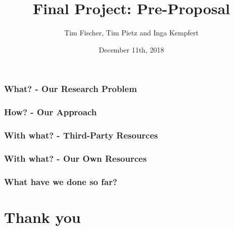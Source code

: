 \documentclass[unknownkeysallowed,aspectratio=169]{beamer}
\date{December 11th, 2018}
\title[Pre-Proposal]{Final Project: Pre-Proposal}
\subtitle[]{}
\author[T. Fischer, T. Pietz, I. Kempfert]{Tim Fischer, Tim Pietz and Inga Kempfert}
\begin{document}
\begin{frame}
\titlepage
\end{frame}


\begin{frame}
  \frametitle{What? - Our Research Problem}
\end{frame}

\begin{frame}
  \frametitle{How? - Our Approach}
\end{frame}

\begin{frame}
  \frametitle{With what? - Third-Party Resources}
\end{frame}

\begin{frame}
  \frametitle{With what? - Our Own Resources}
\end{frame}

\begin{frame}
  \frametitle{What have we done so far?}
\end{frame}

\section{Thank you}
\end{document}
